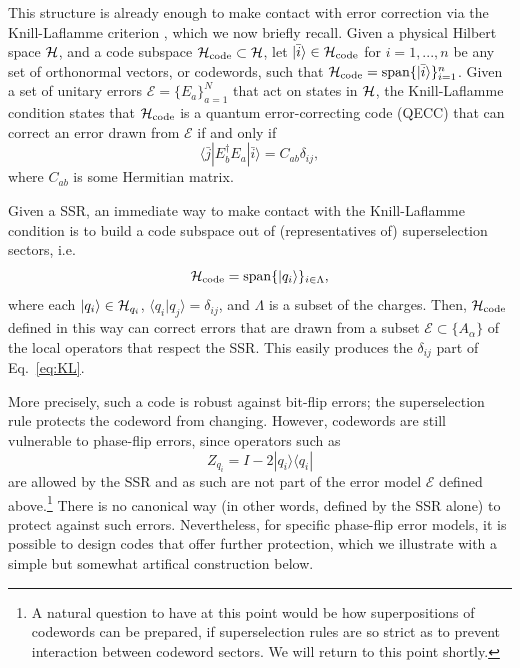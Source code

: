 \documentclass[11pt,english]{article}
\newcommand{\bra}[1]{\langle #1|}
\newcommand{\ket}[1]{|#1\rangle}
\newcommand{\braket}[2]{\langle #1|#2\rangle}
\newcommand{\ketbra}[2]{| #1 \rangle \langle #2 |}
\newcommand{\Hil}{{\cal H}}
\newcommand{\mrm}[1]{\mathrm{#1}}
\begin{document}
This structure is already enough to make contact with error correction via the Knill-Laflamme criterion \cite{knill1997theory}, which we now briefly recall.
Given a physical Hilbert space $\Hil$, and a code subspace $\mathcal{H}_{\rm code}\subset \mathcal{H}$, let $\ket{\bar{i}}\in \mathcal{H}_{\rm code}$ for $ i = 1, ..., n$ be any set of orthonormal vectors, or codewords, such that $\Hil_\mrm{code} = \mrm{span}\{\ket{\bar i}\}_{i=1}^n$.
Given a set of unitary errors $\mathcal{E} = \{E_a\}_{a = 1}^{N}$ that act on states in $\Hil$, the Knill-Laflamme condition states that $\Hil_\mrm{code}$ is a quantum error-correcting code (QECC) that can correct an error drawn from $\mathcal{E}$ if and only if 
\begin{equation} \label{eq:KL}
    \bra{\bar{j}} E_b^\dagger E_a \ket{\bar{i}} = C_{ab} \delta_{ij},
\end{equation}
where $C_{ab}$ is some Hermitian matrix.

Given a SSR, an immediate way to make contact with the Knill-Laflamme condition is to build a code subspace out of (representatives of) superselection sectors, i.e.
\begin{equation}
    \Hil_\mrm{code} = \mrm{span} \{ \ket{q_i} \}_{i \in \Lambda},
\end{equation}
where each $\ket{q_i} \in \Hil_{q_i}$, $\braket{q_i}{q_j} = \delta_{ij}$, and $\Lambda$ is a subset of the charges.
Then, $\Hil_\mrm{code}$ defined in this way can correct errors that are drawn from a subset $\mathcal{E} \subset \{A_\alpha\}$  of the local operators that respect the SSR.
This easily produces the $\delta_{ij}$ part of Eq.~\eqref{eq:KL}.

More precisely, such a code is robust against bit-flip errors; the superselection rule protects the codeword from changing.
However, codewords are still vulnerable to phase-flip errors, since operators such as
\begin{equation} \label{eq:phase-error}
    Z_{q_i} = I - 2 \ketbra{q_i}{q_i}
\end{equation}
are allowed by the SSR and as such are not part of the error model $\mathcal{E}$ defined above.\footnote{A natural question to have at this point would be how superpositions of codewords can be prepared, if superselection rules are so strict as to prevent interaction between codeword sectors. We will return to this point shortly.}
There is no canonical way (in other words, defined by the SSR alone) to protect against such errors.
Nevertheless, for specific phase-flip error models, it is  possible to design codes that offer further protection, which we illustrate with a simple but somewhat artifical construction below.
\end{document}
